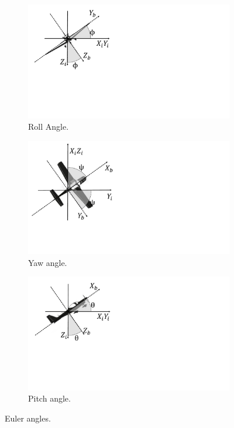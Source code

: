 \documentclass[10pt,fleqn,a4paper,twoside]{article}
\begin{document}
\begin{figure}[h!]
	\centering
	\begin{subfigure}[t]{0.29\textwidth}
	\centering
	\includegraphics[trim = {0cm 6.5cm 0cm 0cm}, clip, angle=0, scale=0.25]{imagens/angulos_foguete_phi}	
	\caption{Roll Angle.}
	\end{subfigure}
	\begin{subfigure}[t]{0.29\textwidth}
		\centering
		\includegraphics[trim = {0cm 4cm 0cm 0cm}, clip, angle=0, scale=0.25]{imagens/angulos_foguete_Psi}	
		\caption{Yaw angle.}
	\end{subfigure}
	\begin{subfigure}[t]{0.29\textwidth}
		\centering
		\includegraphics[trim = {0cm 6.5cm 0cm 0cm}, clip, angle=0, scale=0.25]{imagens/angulos_foguete_theta}	
		\caption{Pitch angle.}
	\end{subfigure}
\label{angulos}
\caption{Euler angles.}
\end{figure}
\end{document}
